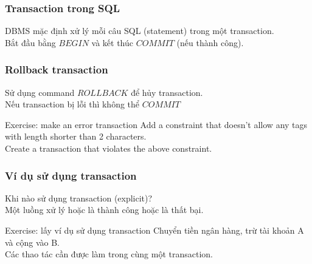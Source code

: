 \documentclass[xcolor={table, dvipsnames}]{beamer}
\begin{document}
\begin{frame}
\frametitle{Transaction trong SQL}
DBMS mặc định xử lý mỗi câu SQL (statement) trong một transaction.\\
Bắt đầu bằng $BEGIN$ và kết thúc $COMMIT$ (nếu thành công).\\
\end{frame}

\begin{frame}
\frametitle{Rollback transaction}
Sử dụng command $ROLLBACK$ để hủy transaction.\\
\pause
Nếu transaction bị lỗi thì không thể $COMMIT$\\
\pause
\begin{block}{Exercise: make an error transaction}
Add a constraint that doesn't allow any tags with length shorter than 2 characters.\\
Create a transaction that violates the above constraint.
\end{block}
\end{frame}

\begin{frame}
\frametitle{Ví dụ sử dụng transaction}
Khi nào sử dụng transaction (explicit)?\\
\pause
Một luồng xử lý hoặc là thành công hoặc là thất bại.\\
\pause
\begin{block}{Exercise: lấy ví dụ sử dụng transaction}
Chuyển tiền ngân hàng, trừ tài khoản A và cộng vào B.\\
Các thao tác cần được làm trong cùng một transaction.\\
\end{block} 
\end{frame}
\end{document}
